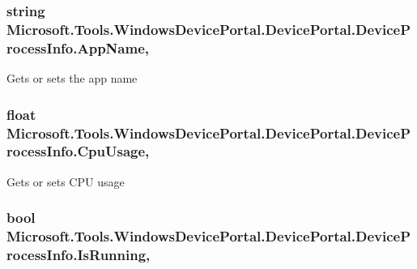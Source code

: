 \subsubsection[{\texorpdfstring{App\+Name}{AppName}}]{\setlength{\rightskip}{0pt plus 5cm}string Microsoft.\+Tools.\+Windows\+Device\+Portal.\+Device\+Portal.\+Device\+Process\+Info.\+App\+Name\hspace{0.3cm}{\ttfamily [get]}, {\ttfamily [set]}}\hypertarget{class_microsoft_1_1_tools_1_1_windows_device_portal_1_1_device_portal_1_1_device_process_info_ac63d9f19488faa01e454e3328edff429}{}\label{class_microsoft_1_1_tools_1_1_windows_device_portal_1_1_device_portal_1_1_device_process_info_ac63d9f19488faa01e454e3328edff429}


Gets or sets the app name 

\subsubsection[{\texorpdfstring{Cpu\+Usage}{CpuUsage}}]{\setlength{\rightskip}{0pt plus 5cm}float Microsoft.\+Tools.\+Windows\+Device\+Portal.\+Device\+Portal.\+Device\+Process\+Info.\+Cpu\+Usage\hspace{0.3cm}{\ttfamily [get]}, {\ttfamily [set]}}\hypertarget{class_microsoft_1_1_tools_1_1_windows_device_portal_1_1_device_portal_1_1_device_process_info_abbc79d7a408b330499d179f651f90ae7}{}\label{class_microsoft_1_1_tools_1_1_windows_device_portal_1_1_device_portal_1_1_device_process_info_abbc79d7a408b330499d179f651f90ae7}


Gets or sets C\+PU usage 

\subsubsection[{\texorpdfstring{Is\+Running}{IsRunning}}]{\setlength{\rightskip}{0pt plus 5cm}bool Microsoft.\+Tools.\+Windows\+Device\+Portal.\+Device\+Portal.\+Device\+Process\+Info.\+Is\+Running\hspace{0.3cm}{\ttfamily [get]}, {\ttfamily [set]}}\hypertarget{class_microsoft_1_1_tools_1_1_windows_device_portal_1_1_device_portal_1_1_device_process_info_a6a5ddefba6ce8459d9d11b6059bd1063}{}\label{class_microsoft_1_1_tools_1_1_windows_device_portal_1_1_device_portal_1_1_device_process_info_a6a5ddefba6ce8459d9d11b6059bd1063}



